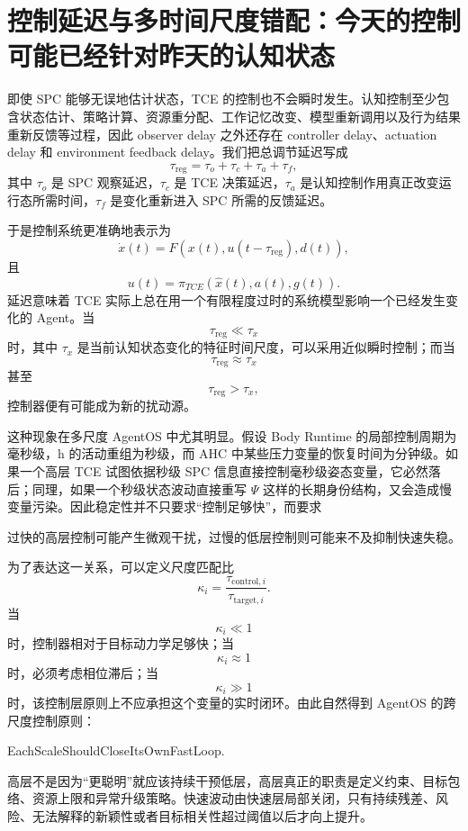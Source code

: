 \section{控制延迟与多时间尺度错配：今天的控制可能已经针对昨天的认知状态}

即使 SPC 能够无误地估计状态，TCE 的控制也不会瞬时发生。认知控制至少包含状态估计、策略计算、资源重分配、工作记忆改变、模型重新调用以及行为结果重新反馈等过程，因此 observer delay 之外还存在 controller delay、actuation delay 和 environment feedback delay。我们把总调节延迟写成
\[
\tau_{\mathrm{reg}}
=
\tau_o
+
\tau_c
+
\tau_a
+
\tau_f,
\]
其中 $\tau_o$ 是 SPC 观察延迟，$\tau_c$ 是 TCE 决策延迟，$\tau_a$ 是认知控制作用真正改变运行态所需时间，$\tau_f$ 是变化重新进入 SPC 所需的反馈延迟。

于是控制系统更准确地表示为
\[
\dot{x}(t)
=
F
\left(
x(t),
u(t-\tau_{\mathrm{reg}}),
d(t)
\right),
\]
且
\[
u(t)
=
\pi_{TCE}
\left(
\hat{x}(t),
a(t),
g(t)
\right).
\]
延迟意味着 TCE 实际上总在用一个有限程度过时的系统模型影响一个已经发生变化的 Agent。当
\[
\tau_{\mathrm{reg}}
\ll
\tau_x
\]
时，其中 $\tau_x$ 是当前认知状态变化的特征时间尺度，可以采用近似瞬时控制；而当
\[
\tau_{\mathrm{reg}}
\approx
\tau_x
\]
甚至
\[
\tau_{\mathrm{reg}}
>
\tau_x,
\]
控制器便有可能成为新的扰动源。

这种现象在多尺度 AgentOS 中尤其明显。假设 Body Runtime 的局部控制周期为毫秒级，h 的活动重组为秒级，而 AHC 中某些压力变量的恢复时间为分钟级。如果一个高层 TCE 试图依据秒级 SPC 信息直接控制毫秒级姿态变量，它必然落后；同理，如果一个秒级状态波动直接重写 $\Psi$ 这样的长期身份结构，又会造成慢变量污染。因此稳定性并不只要求“控制足够快”，而要求
\begin{statementbox}
\centering
{}
\end{statementbox}
过快的高层控制可能产生微观干扰，过慢的低层控制则可能来不及抑制快速失稳。

为了表达这一关系，可以定义尺度匹配比
\[
\kappa_i
=
\frac{\tau_{\mathrm{control},i}}
{\tau_{\mathrm{target},i}}.
\]
当
\[
\kappa_i\ll 1
\]
时，控制器相对于目标动力学足够快；当
\[
\kappa_i\approx 1
\]
时，必须考虑相位滞后；当
\[
\kappa_i\gg 1
\]
时，该控制层原则上不应承担这个变量的实时闭环。由此自然得到 AgentOS 的跨尺度控制原则：
\begin{statementbox}
EachScaleShouldCloseItsOwnFastLoop.
\end{statementbox}
高层不是因为“更聪明”就应该持续干预低层，高层真正的职责是定义约束、目标包络、资源上限和异常升级策略。快速波动由快速层局部关闭，只有持续残差、风险、无法解释的新颖性或者目标相关性超过阈值以后才向上提升。

